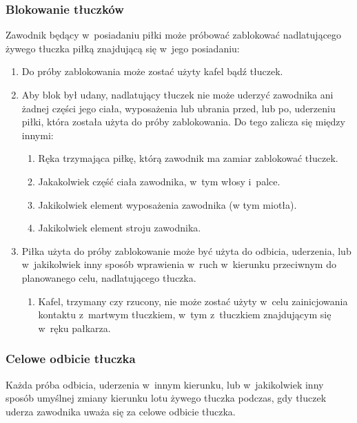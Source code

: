 \documentclass[12pt,a4paper]{article}
\begin{document}
\subsubsection{Blokowanie tłuczków}

Zawodnik będący w~posiadaniu piłki może próbować zablokować
nadlatującego żywego tłuczka piłką znajdującą się w~jego posiadaniu:

\begin{enumerate}
	\item
	      Do próby zablokowania może zostać użyty kafel bądź tłuczek.
	\item
	      Aby blok był udany, nadlatujący tłuczek nie może uderzyć zawodnika ani
	      żadnej części jego ciała, wyposażenia lub ubrania przed, lub po,
	      uderzeniu piłki, która została użyta do próby zablokowania. Do tego
	      zalicza się między innymi:

	      \begin{enumerate}
		      \item
		            Ręka trzymająca piłkę, którą zawodnik ma zamiar zablokować tłuczek.
		      \item
		            Jakakolwiek część ciała zawodnika, w~tym włosy i~palce.
		      \item
		            Jakikolwiek element wyposażenia zawodnika (w tym miotła).
		      \item
		            Jakikolwiek element stroju zawodnika.
	      \end{enumerate}
	\item
	      Piłka użyta do próby zablokowanie może być użyta do odbicia,
	      uderzenia, lub w~jakikolwiek inny sposób wprawienia w~ruch w~kierunku
	      przeciwnym do planowanego celu, nadlatującego tłuczka.

	      \begin{enumerate}
		      \item
		            Kafel, trzymany czy rzucony, nie może zostać użyty w~celu
		            zainicjowania kontaktu z~martwym tłuczkiem, w~tym z~tłuczkiem
		            znajdującym się w~ręku pałkarza.
	      \end{enumerate}
\end{enumerate}

\subsubsection{Celowe odbicie tłuczka}

Każda próba odbicia, uderzenia w~innym kierunku, lub w~jakikolwiek inny
sposób umyślnej zmiany kierunku lotu żywego tłuczka podczas, gdy tłuczek
uderza zawodnika uważa się za celowe odbicie tłuczka.
\end{document}
